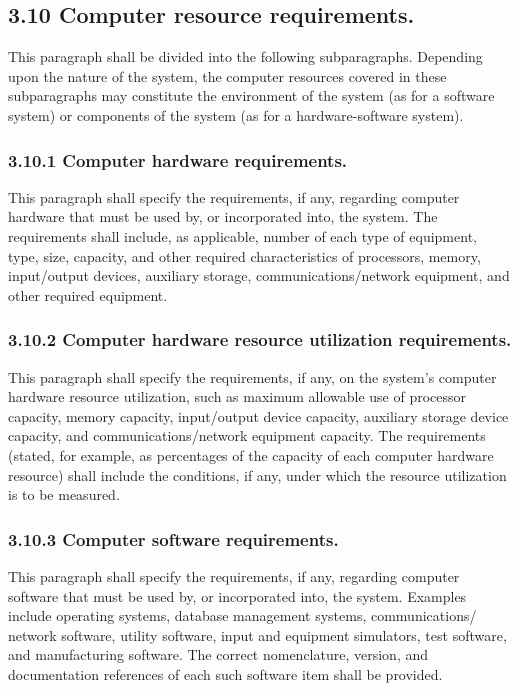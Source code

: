 \subsection{3.10 Computer resource requirements.}

This paragraph shall be divided into the following subparagraphs.
Depending upon the nature of the system, the computer resources covered
in these subparagraphs may constitute the environment of the system (as
for a software system) or components of the system (as for a
hardware-software system).

\subsubsection{3.10.1 Computer hardware requirements.}

This paragraph shall specify the requirements, if any, regarding
computer hardware that must be used by, or incorporated into, the
system. The requirements shall include, as applicable, number of each
type of equipment, type, size, capacity, and other required
characteristics of processors, memory, input/output devices, auxiliary
storage, communications/network equipment, and other required equipment.

\subsubsection{3.10.2 Computer hardware resource utilization
requirements.}

This paragraph shall specify the requirements, if any, on the system's
computer hardware resource utilization, such as maximum allowable use of
processor capacity, memory capacity, input/output device capacity,
auxiliary storage device capacity, and communications/network equipment
capacity. The requirements (stated, for example, as percentages of the
capacity of each computer hardware resource) shall include the
conditions, if any, under which the resource utilization is to be
measured.

\subsubsection{3.10.3 Computer software requirements.}

This paragraph shall specify the requirements, if any, regarding
computer software that must be used by, or incorporated into, the
system. Examples include operating systems, database management systems,
communications/ network software, utility software, input and equipment
simulators, test software, and manufacturing software. The correct
nomenclature, version, and documentation references of each such
software item shall be provided.

